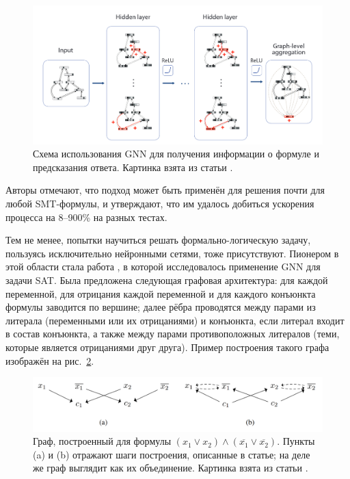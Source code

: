 \begin{figure}[ht]
\begin{center}
    \includegraphics[scale=0.25]{./assets/gnn-for-scheduling-process.png}
    \caption{\label{gnn-for-scheduling-process} Схема использования GNN для получения информации о формуле и предсказания ответа. Картинка взята из статьи \cite{gnn-for-scheduling-paper}.}
\end{center}
\end{figure}

Авторы отмечают, что подход может быть применён для решения почти для любой SMT-формулы, и утверждают, что им удалось добиться ускорения процесса на 8--900\% на разных тестах.


Тем не менее, попытки научиться решать формально-логическую задачу, пользуясь исключительно нейронными сетями, тоже присутствуют. Пионером в этой области стала работа \cite{neurosat-paper}, в которой исследовалось применение GNN для задачи SAT. Была предложена следующая графовая архитектура: для каждой переменной, для отрицания каждой переменной и для каждого конъюнкта формулы заводится по вершине; далее рёбра проводятся между парами из литерала (переменными или их отрицаниями) и конъюнкта, если литерал входит в состав конъюнкта, а также между парами противоположных литералов (теми, которые является отрицаниями друг друга). Пример построения такого графа изображён на рис.~\ref{neurosat-mpnn}.

\begin{figure}[ht]
\begin{center}
    \includegraphics[scale=0.25]{./assets/neurosat-mpnn.png}
    \caption{\label{neurosat-mpnn} Граф, построенный для формулы $(x_1 \vee x_2) \wedge (\overline{x_1} \vee \overline{x_2})$. Пункты (a) и (b) отражают шаги построения, описанные в статье; на деле же граф выглядит как их объединение. Картинка взята из статьи \cite{neurosat-paper}.}
\end{center}
\end{figure}

